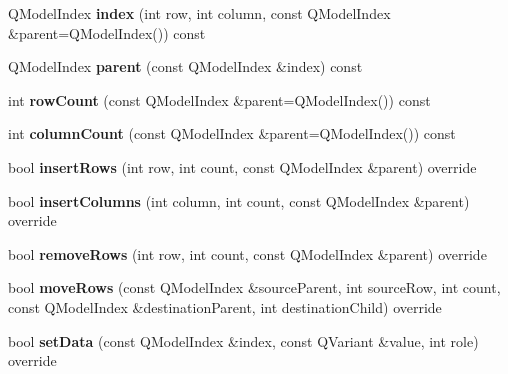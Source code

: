 \begin{DoxyCompactItemize}
Q\+Model\+Index {\bfseries index} (int row, int column, const Q\+Model\+Index \&parent=Q\+Model\+Index()) const
\item 
\mbox{\label{class_extendable_tree_item_model_a9b934874682ee5356055dda8f0f7e6bb}} 
Q\+Model\+Index {\bfseries parent} (const Q\+Model\+Index \&index) const
\item 
\mbox{\label{class_extendable_tree_item_model_a715c7bed15e5a6ee66d370aaac380c1e}} 
int {\bfseries row\+Count} (const Q\+Model\+Index \&parent=Q\+Model\+Index()) const
\item 
\mbox{\label{class_extendable_tree_item_model_acf7dffdfaeeedff1e6dc7912c914a6da}} 
int {\bfseries column\+Count} (const Q\+Model\+Index \&parent=Q\+Model\+Index()) const
\item 
\mbox{\label{class_extendable_tree_item_model_a60423d77dbf3227fcf76e721c22ee591}} 
bool {\bfseries insert\+Rows} (int row, int count, const Q\+Model\+Index \&parent) override
\item 
\mbox{\label{class_extendable_tree_item_model_a0d3d16a109c3cac703ca20de6c50a45e}} 
bool {\bfseries insert\+Columns} (int column, int count, const Q\+Model\+Index \&parent) override
\item 
\mbox{\label{class_extendable_tree_item_model_a6657cfabdb3f8f696223b04a64661562}} 
bool {\bfseries remove\+Rows} (int row, int count, const Q\+Model\+Index \&parent) override
\item 
\mbox{\label{class_extendable_tree_item_model_ac23f589bb25aaa93534b37e2d08f1cbd}} 
bool {\bfseries move\+Rows} (const Q\+Model\+Index \&source\+Parent, int source\+Row, int count, const Q\+Model\+Index \&destination\+Parent, int destination\+Child) override
\item 
\mbox{\label{class_extendable_tree_item_model_ade1332b1bb879ba4a621898b72037c8d}} 
bool {\bfseries set\+Data} (const Q\+Model\+Index \&index, const Q\+Variant \&value, int role) override
\item 

\end{DoxyCompactItemize}
